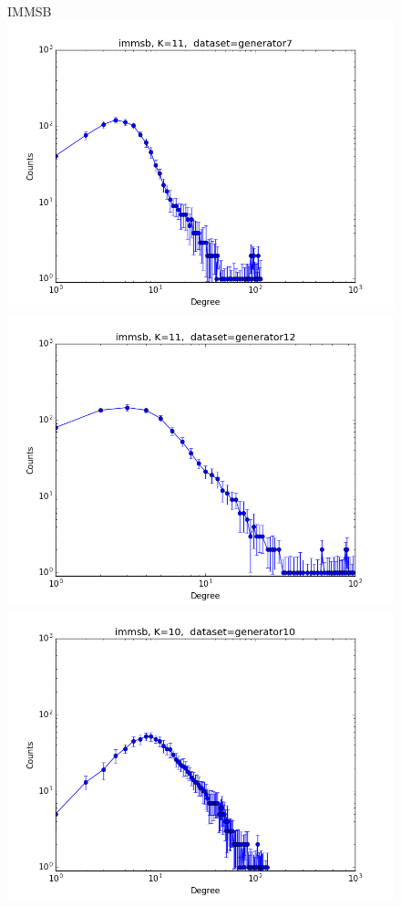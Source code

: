
\begin{figure}[ht]
    \vspace{-3cm}
	\centering IMMSB\\
	\includegraphics[scale=0.27]{img/expe/1_mmsb/figure_1}
	\endminipage
	\includegraphics[scale=0.27]{img/expe/2_mmsb/figure_1}
	\endminipage
	\includegraphics[scale=0.27]{img/expe/3_mmsb/figure_1}

\end{figure}
